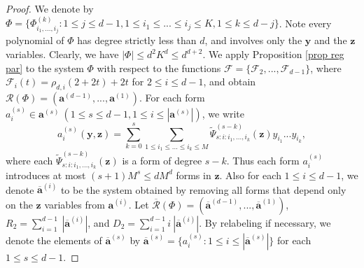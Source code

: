 \documentclass[12pt]{amsart}
\theoremstyle{definition}
\theoremstyle{remark}
\numberwithin{equation}{section}
\begin{document}
\begin{proof}
We denote by $\Phi = \{ \Phi^{(k)}_{i_1, ..., i_{j}} : 1 \leq j \leq d-1, 1 \leq i_1 \leq ... \leq i_j \leq K, 1 \leq k \leq d-j \}$.
Note every polynomial of $\Phi$ has degree strictly less than $d$, and involves only the $\mathbf{y}$ and the $\mathbf{z}$ variables.
Clearly, we have $|\Phi| \leq d^2 K^d \leq d^{d+2}$. We apply Proposition \ref{prop reg par} to the system $\Phi$ with respect
to the functions $\boldsymbol{\mathcal{F}} = \{\mathcal{F}_2, ..., \mathcal{F}_{d-1} \}$, where $\mathcal{F}_i(t) = {\rho}_{d,i} (2 + 2t) + 2t$ for $2 \leq i \leq d-1$, and obtain
$\mathcal{R}(\Phi) = ( \mathbf{a}^{(d-1)}, ..., \mathbf{a}^{(1)} )$.
For each form $a^{({s})}_i \in \mathbf{a}^{({s})} \ (1 \leq s \leq d-1, 1 \leq i \leq | \mathbf{a}^{({s})}|)$, we write
\begin{equation}
\label{defn of a's}
a^{({s})}_i(\mathbf{y}, \mathbf{z}) = \sum_{k=0}^{s} \sum_{1 \leq i_1 \leq ... \leq i_k \leq M} \widetilde{\Psi}^{(s - k)}_{{s} :i: i_1, ..., i_k}(\mathbf{z}) y_{i_1} ... y_{i_k},
\end{equation}
where each
$\widetilde{\Psi}^{(s - k)}_{{s} :i: i_1, ..., i_k}(\mathbf{z})$ is a form of degree $s - k$.
Thus each form $a^{({s})}_i$ introduces at most $({s}+1) M^{s} \leq d M^d$ forms in $\mathbf{z}$.
Also for each $1 \leq i \leq d-1$, we denote $\overline{\mathbf{a}}^{(i)}$
to be the system obtained by removing all forms that depend only on the $\mathbf{z}$ variables from $\mathbf{a}^{(i)}$.
Let $\overline{\mathcal{R}}(\Phi)= (\overline{\mathbf{a}}^{(d-1)}, ..., \overline{\mathbf{a}}^{(1)} )$, $R_2 = \sum_{i = 1}^{d-1} \ | \overline{\mathbf{a}}^{(i)} |$, and $D_2 = \sum_{i = 1}^{d-1} i \ | \overline{\mathbf{a}}^{(i)} |$. By relabeling if necessary, we denote the
elements of $\overline{\mathbf{a}}^{(s)}$ by $\overline{\mathbf{a}}^{(s)} = \{ a^{(s)}_i : 1 \leq i \leq | \overline{\mathbf{a}}^{(s)} | \}$
for each $1 \leq s \leq d-1$.


\end{proof}
\end{document}
